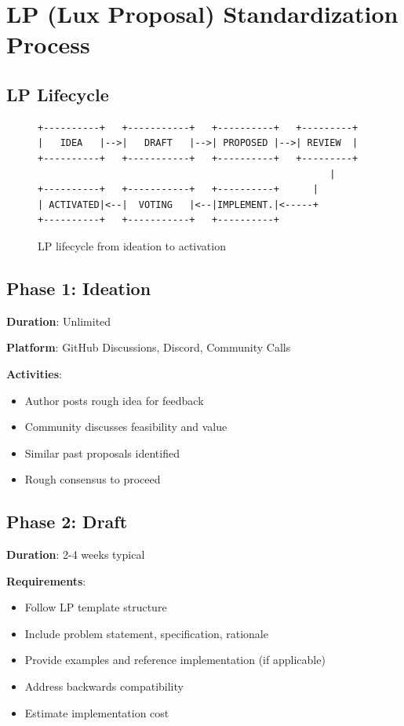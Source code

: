 \section{LP (Lux Proposal) Standardization Process}


\subsection{LP Lifecycle}

\begin{figure}[h]
\centering
\begin{verbatim}
+----------+   +-----------+   +----------+   +---------+
|   IDEA   |-->|   DRAFT   |-->| PROPOSED |-->| REVIEW  |
+----------+   +-----------+   +----------+   +---------+
                                                    |
+----------+   +-----------+   +----------+      |
| ACTIVATED|<--|  VOTING   |<--|IMPLEMENT.|<-----+
+----------+   +-----------+   +----------+
\end{verbatim}
\caption{LP lifecycle from ideation to activation}
\end{figure}

\subsection{Phase 1: Ideation}

\textbf{Duration}: Unlimited

\textbf{Platform}: GitHub Discussions, Discord, Community Calls

\textbf{Activities}:
\begin{itemize}
\item Author posts rough idea for feedback
\item Community discusses feasibility and value
\item Similar past proposals identified
\item Rough consensus to proceed
\end{itemize}

\subsection{Phase 2: Draft}

\textbf{Duration}: 2-4 weeks typical

\textbf{Requirements}:
\begin{itemize}
\item Follow LP template structure
\item Include problem statement, specification, rationale
\item Provide examples and reference implementation (if applicable)
\item Address backwards compatibility
\item Estimate implementation cost
\end{itemize}

